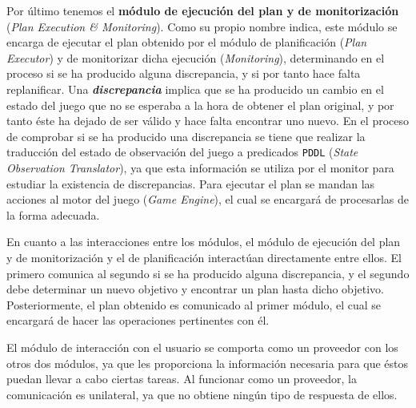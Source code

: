 Por último tenemos el \textbf{módulo de ejecución del plan y de monitorización}
(\textit{Plan Execution \& Monitoring}). Como su propio nombre indica, este módulo
se encarga de ejecutar el plan obtenido por el módulo de planificación (\textit{Plan Executor})
y de monitorizar dicha ejecución (\textit{Monitoring}), determinando en el proceso si se ha
producido alguna discrepancia, y si por tanto hace falta replanificar. Una \textbf{\textit{discrepancia}} implica
que se ha producido un cambio en el estado del juego que no se esperaba a la hora de obtener
el plan original, y por tanto éste ha dejado de ser válido y hace falta encontrar uno nuevo.
En el proceso de comprobar si se ha producido una discrepancia se tiene que realizar la traducción del
estado de observación del juego a predicados \texttt{PDDL} (\textit{State Observation Translator}),
ya que esta información se utiliza por el monitor para estudiar la existencia de discrepancias.
Para ejecutar el plan se mandan las acciones al motor del juego (\textit{Game Engine}), el cual
se encargará de procesarlas de la forma adecuada.

En cuanto a las interacciones entre los módulos, el módulo de ejecución del plan y de
monitorización y el de planificación interactúan directamente entre ellos. El primero
comunica al segundo si se ha producido alguna discrepancia, y el segundo debe determinar
un nuevo objetivo y encontrar un plan hasta dicho objetivo. Posteriormente, el plan obtenido
es comunicado al primer módulo, el cual se encargará de hacer las operaciones pertinentes
con él.

El módulo de interacción con el usuario se comporta como un proveedor con los otros dos
módulos, ya que les proporciona la información necesaria para que éstos puedan
llevar a cabo ciertas tareas. Al funcionar como un proveedor, la comunicación es unilateral,
ya que no obtiene ningún tipo de respuesta de ellos.
